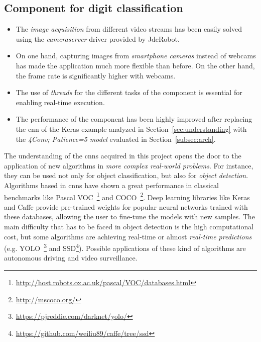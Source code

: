 \subsection*{Component for digit classification}
\begin{itemize}
	\item The \emph{image acquisition} from different video streams has been easily solved using the \textit{cameraserver} driver provided by JdeRobot.
	\item On one hand, capturing images from \emph{smartphone cameras} instead of webcams has made the application much more flexible than before. On the other hand, the frame rate is significantly higher with webcams.
	\item The use of \emph{threads} for the different tasks of the component is essential for enabling real-time execution.
	\item The performance of the component has been highly improved after replacing the \gls{cnn} of the Keras example analyzed in Section~\ref{sec:understanding} with the \emph{\textit{4Conv; Patience=5} model} evaluated in Section~\ref{subsec:arch}.
\end{itemize}

The understanding of the \glspl{cnn} acquired in this project opens the door to the application of new algorithms in \emph{more complex real-world problems}. For instance, they can be used not only for object classification, but also for \emph{object detection}. Algorithms based in \glspl{cnn} have shown a great performance in classical benchmarks like Pascal VOC~\footnote{\url{http://host.robots.ox.ac.uk/pascal/VOC/databases.html}} and COCO~\footnote{\url{http://mscoco.org/}}. Deep learning libraries like Keras and Caffe provide pre-trained weights for popular neural networks trained with these databases, allowing the user to fine-tune the models with new samples. The main difficulty that has to be faced in object detection is the high computational cost, but some algorithms are achieving real-time or almost \emph{real-time predictions} (e.g. YOLO~\footnote{\url{https://pjreddie.com/darknet/yolo/}} and SSD\footnote{\url{https://github.com/weiliu89/caffe/tree/ssd}}). Possible applications of these kind of algorithms are autonomous driving and video surveillance.